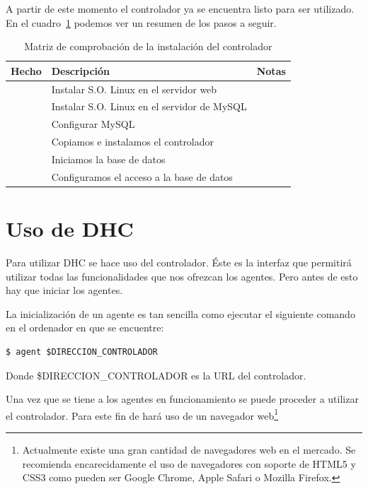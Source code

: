 A partir de este momento el controlador ya se encuentra listo para ser utilizado. En el cuadro~\ref{tab:mat_controlador} podemos ver un resumen de los pasos a seguir.

\begin{table}
	\centering
	
	\begin{tabular}{|c|p{5.6cm}|p{5.6cm}|}
	\hline
	Hecho & Descripción & Notas\\
	\hline
	& Instalar S.O. Linux en el servidor web & \\
	\hline
	& Instalar S.O. Linux en el servidor de MySQL & \\
	\hline
	& Configurar MySQL & \\
	\hline
	& Copiamos e instalamos el controlador & \\
	\hline
	& Iniciamos la base de datos & \\
	\hline
	& Configuramos el acceso a la base de datos & \\
	\hline
	\end{tabular}
	
	\caption{Matriz de comprobación de la instalación del controlador}\label{tab:mat_controlador}
\end{table}

\section{Uso de DHC}

Para utilizar DHC se hace uso del controlador. Éste es la interfaz que permitirá utilizar todas las funcionalidades que nos ofrezcan los agentes. Pero antes de esto hay que iniciar los agentes.

La inicialización de un agente es tan sencilla como ejecutar el siguiente comando en el ordenador en que se encuentre:

\begin{verbatim}
$ agent $DIRECCION_CONTROLADOR
\end{verbatim}

Donde \$DIRECCION\_CONTROLADOR es la URL del controlador.

Una vez que se tiene a los agentes en funcionamiento se puede proceder a utilizar el controlador. Para este fin de hará uso de un navegador web\footnote{Actualmente existe una gran cantidad de navegadores web en el mercado. Se recomienda encarecidamente el uso de navegadores con soporte de HTML5 y CSS3 como pueden ser Google Chrome, Apple Safari o Mozilla Firefox.}

